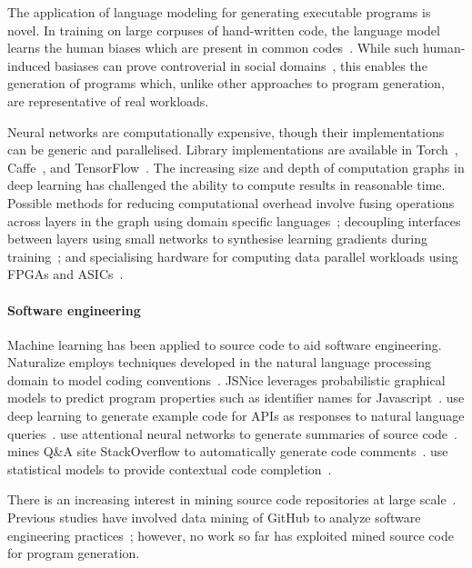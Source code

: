 The application of language modeling for generating executable programs is novel. In training on large corpuses of hand-written code, the language model learns the human biases which are present in common codes~\cite{Caliskan-islam2016}. While such human-induced basiases can prove controverial in social domains~\cite{Bolukbasi2016,Joseph2017}, this enables the generation of programs which, unlike other approaches to program generation, are representative of real workloads.

Neural networks are computationally expensive, though their implementations can be generic and parallelised. Library implementations are available in Torch~\cite{Collobert2011}, Caffe~\cite{Jia2014}, and TensorFlow~\cite{Abadi}. The increasing size and depth of computation graphs in deep learning has challenged the ability to compute results in reasonable time. Possible methods for reducing computational overhead involve fusing operations across layers in the graph using domain specific languages~\cite{Truong2016,Ashari2015a,Potter2015}; decoupling interfaces between layers using small networks to synthesise learning gradients during training~\cite{Jaderberg2016a}; and specialising hardware for computing data parallel workloads using FPGAs and ASICs~\cite{Misra2010}.


\paragraph{Software engineering} Machine learning has been applied to source code to aid software engineering.  Naturalize employs techniques developed in the natural language processing domain to model coding conventions~\cite{Allamanis2014a}. JSNice leverages probabilistic graphical models to predict program properties such as identifier names for Javascript~\cite{Raychev}. \citeauthor{Zhang2015a} use deep learning to generate example code for APIs as responses to natural language queries~\cite{Zhang2015a}. \citeauthor{Allamanis2016} use attentional neural networks to generate summaries of source code~\cite{Allamanis2016}. \citeauthor{Wong2013} mines Q\&A site StackOverflow to automatically generate code comments~\cite{Wong2013}. \citeauthor{Raychev2014} use statistical models to provide contextual code completion~\cite{Raychev2014}.

There is an increasing interest in mining source code repositories at large scale~\cite{Allamanis2013a,White2015a,Bird2009}. Previous studies have involved data mining of GitHub to analyze software engineering practices~\cite{Wu2014,Guzman2014,Baishakhi2014a,Vasilescu2015}; however, no work so far has exploited mined source code for program generation.


